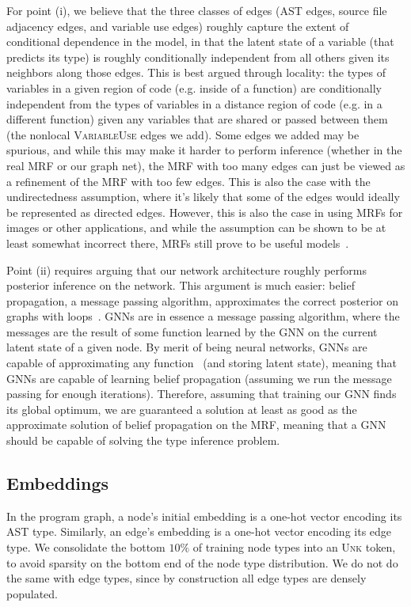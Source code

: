 For point (i), we believe that the three classes of edges (AST edges, source file adjacency edges, and variable use edges) roughly capture the extent of conditional dependence in the model, in that the latent state of a variable (that predicts its type) is roughly conditionally independent from all others given its neighbors along those edges.
This is best argued through locality: the types of variables in a given region of code (e.g. inside of a function) are conditionally independent from the types of variables in a distance region of code (e.g. in a different function) given any variables that are shared or passed between them (the nonlocal \textsc{VariableUse} edges we add).
Some edges we added may be spurious, and while this may make it harder to perform inference (whether in the real MRF or our graph net), the MRF with too many edges can just be viewed as a refinement of the MRF with too few edges.
This is also the case with the undirectedness assumption, where it's likely that some of the edges would ideally be represented as directed edges.
However, this is also the case in using MRFs for images or other applications, and while the assumption can be shown to be at least somewhat incorrect there, MRFs still prove to be useful models~\cite{rangarajan95markov}.

Point (ii) requires arguing that our network architecture roughly performs posterior inference on the network.
This argument is much easier: belief propagation, a message passing algorithm, approximates the correct posterior on graphs with loops~\cite{weiss2000correctness}.
GNNs are in essence a message passing algorithm, where the messages are the result of some function learned by the GNN on the current latent state of a given node.
By merit of being neural networks, GNNs are capable of approximating any function~\cite{hornik1989multilayer} (and storing latent state), meaning that GNNs are capable of learning belief propagation (assuming we run the message passing for enough iterations).
Therefore, assuming that training our GNN finds its global optimum, we are guaranteed a solution at least as good as the approximate solution of belief propagation on the MRF, meaning that a GNN should be capable of solving the type inference problem.

\subsection{Embeddings}

In the program graph, a node's initial embedding is a one-hot vector encoding its AST type.
Similarly, an edge's embedding is a one-hot vector encoding its edge type.
We consolidate the bottom $10\%$ of training node types into an \textsc{Unk} token, to avoid sparsity on the bottom end of the node type distribution.
We do not do the same with edge types, since by construction all edge types are densely populated.

